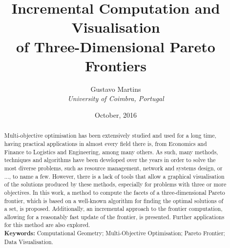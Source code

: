 \documentclass[10pt, twoside]{article}
\title{\textbf{\huge Incremental Computation and Visualisation\\of Three-Dimensional Pareto Frontiers}}
\author{Gustavo Martins\\\normalsize \textit{University of Coimbra, Portugal}}
\date{October, 2016}
\begin{document}
	
\maketitle

\begin{abstract}
Multi-objective optimisation has been extensively studied and used for a long time, having practical applications in almost every field there is, from Economics and Finance to Logistics and Engineering, among many others. As such, many methods, techniques and algorithms have been developed over the years in order to solve the most diverse problems, such as resource management, network and systems design, or ..., to name a few. However, there is a lack of tools that allow a graphical visualisation of the solutions produced by these methods, especially for problems with three or more objectives. In this work, a method to compute the facets of a three-dimensional Pareto frontier, which is based on a well-known algorithm for finding the optimal solutions of a set, is proposed. Additionally, an incremental approach to the frontier computation, allowing for a reasonably fast update of the frontier, is presented. Further applications for this method are also explored.\\

\noindent\textbf{Keywords:} Computational Geometry; Multi-Objective Optimisation; Pareto Frontier; Data Visualisation.
\end{abstract}







\end{document}
